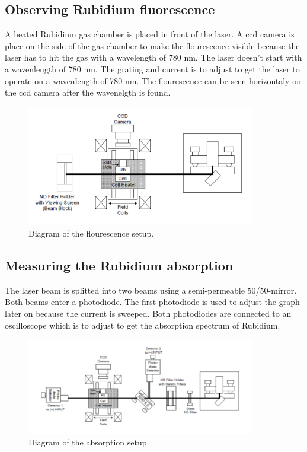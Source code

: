 \subsection{Observing Rubidium fluorescence}
A heated Rubidium gas chamber is placed in front of the laser. A ccd camera is place on the side of the gas chamber to make the flourescence visible because the laser has to hit the gas with a wavelength of 780 nm. The laser doesn't start with a wavenlength of 780 nm. The grating and current is to adjust to get the laser to operate on a wavenlength of 780 nm. The flourescence can be seen horizontaly on the ccd camera after the wavenelgth is found.
\begin{figure}[H]
    \centering
    \includegraphics[width=10cm]{content/exp2.png}
    \caption{Diagram of the flourescence setup.}
\end{figure}
\subsection{Measuring the Rubidium absorption}
 The laser beam is splitted into two beams using a semi-permeable 50/50-mirror. Both beams enter a photodiode. The first photodiode is used to adjust the graph later on because the current is sweeped. Both photodiodes are connected to an oscilloscope which is to adjust to get the absorption spectrum of Rubidium. 
 \begin{figure}[H]
    \centering
    \includegraphics[width=10cm]{content/exp3.png}
    \caption{Diagram of the absorption setup.}
\end{figure} 

